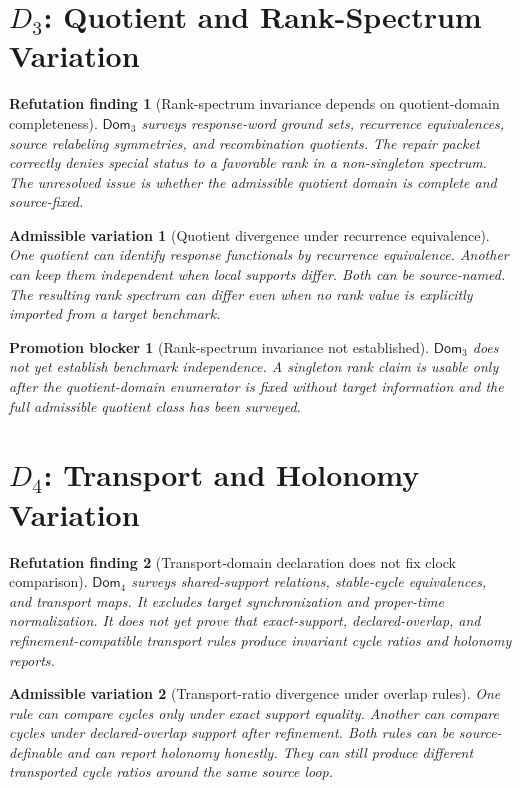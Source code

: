 \documentclass[11pt]{article}
\newcommand{\Dom}{\mathsf{Dom}}
\newtheorem{finding}{Refutation finding}
\newtheorem{variation}{Admissible variation}
\newtheorem{blocker}{Promotion blocker}
\begin{document}
\section{\texorpdfstring{\(D_3\)}{D3}: Quotient and Rank-Spectrum Variation}

\begin{finding}[Rank-spectrum invariance depends on quotient-domain completeness]
\(\Dom_3\) surveys response-word ground sets, recurrence equivalences,
source relabeling symmetries, and recombination quotients. The repair packet
correctly denies special status to a favorable rank in a non-singleton
spectrum. The unresolved issue is whether the admissible quotient domain is
complete and source-fixed.
\end{finding}

\begin{variation}[Quotient divergence under recurrence equivalence]
One quotient can identify response functionals by recurrence equivalence.
Another can keep them independent when local supports differ. Both can be
source-named. The resulting rank spectrum can differ even when no rank value
is explicitly imported from a target benchmark.
\end{variation}

\begin{blocker}[Rank-spectrum invariance not established]
\(\Dom_3\) does not yet establish benchmark independence. A singleton rank
claim is usable only after the quotient-domain enumerator is fixed without
target information and the full admissible quotient class has been surveyed.
\end{blocker}

\section{\texorpdfstring{\(D_4\)}{D4}: Transport and Holonomy Variation}

\begin{finding}[Transport-domain declaration does not fix clock comparison]
\(\Dom_4\) surveys shared-support relations, stable-cycle equivalences, and
transport maps. It excludes target synchronization and proper-time
normalization. It does not yet prove that exact-support, declared-overlap,
and refinement-compatible transport rules produce invariant cycle ratios and
holonomy reports.
\end{finding}

\begin{variation}[Transport-ratio divergence under overlap rules]
One rule can compare cycles only under exact support equality. Another can
compare cycles under declared-overlap support after refinement. Both rules
can be source-definable and can report holonomy honestly. They can still
produce different transported cycle ratios around the same source loop.
\end{variation}
\end{document}
